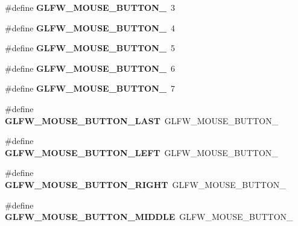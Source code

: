 \begin{DoxyCompactItemize}
\item 
\mbox{\label{group__buttons_ga53f4097bb01d5521c7d9513418c91ca9}} 
\#define {\bfseries G\+L\+F\+W\+\_\+\+M\+O\+U\+S\+E\+\_\+\+B\+U\+T\+T\+O\+N\+\_}~3
\item 
\mbox{\label{group__buttons_gaf08c4ddecb051d3d9667db1d5e417c9c}} 
\#define {\bfseries G\+L\+F\+W\+\_\+\+M\+O\+U\+S\+E\+\_\+\+B\+U\+T\+T\+O\+N\+\_}~4
\item 
\mbox{\label{group__buttons_gae8513e06aab8aa393b595f22c6d8257a}} 
\#define {\bfseries G\+L\+F\+W\+\_\+\+M\+O\+U\+S\+E\+\_\+\+B\+U\+T\+T\+O\+N\+\_}~5
\item 
\mbox{\label{group__buttons_ga8b02a1ab55dde45b3a3883d54ffd7dc7}} 
\#define {\bfseries G\+L\+F\+W\+\_\+\+M\+O\+U\+S\+E\+\_\+\+B\+U\+T\+T\+O\+N\+\_}~6
\item 
\mbox{\label{group__buttons_ga35d5c4263e0dc0d0a4731ca6c562f32c}} 
\#define {\bfseries G\+L\+F\+W\+\_\+\+M\+O\+U\+S\+E\+\_\+\+B\+U\+T\+T\+O\+N\+\_}~7
\item 
\mbox{\label{group__buttons_gab1fd86a4518a9141ec7bcde2e15a2fdf}} 
\#define {\bfseries G\+L\+F\+W\+\_\+\+M\+O\+U\+S\+E\+\_\+\+B\+U\+T\+T\+O\+N\+\_\+\+L\+A\+ST}~G\+L\+F\+W\+\_\+\+M\+O\+U\+S\+E\+\_\+\+B\+U\+T\+T\+O\+N\+\_
\item 
\mbox{\label{group__buttons_gaf37100431dcd5082d48f95ee8bc8cd56}} 
\#define {\bfseries G\+L\+F\+W\+\_\+\+M\+O\+U\+S\+E\+\_\+\+B\+U\+T\+T\+O\+N\+\_\+\+L\+E\+FT}~G\+L\+F\+W\+\_\+\+M\+O\+U\+S\+E\+\_\+\+B\+U\+T\+T\+O\+N\+\_
\item 
\mbox{\label{group__buttons_ga3e2f2cf3c4942df73cc094247d275e74}} 
\#define {\bfseries G\+L\+F\+W\+\_\+\+M\+O\+U\+S\+E\+\_\+\+B\+U\+T\+T\+O\+N\+\_\+\+R\+I\+G\+HT}~G\+L\+F\+W\+\_\+\+M\+O\+U\+S\+E\+\_\+\+B\+U\+T\+T\+O\+N\+\_
\item 
\mbox{\label{group__buttons_ga34a4d2a701434f763fd93a2ff842b95a}} 
\#define {\bfseries G\+L\+F\+W\+\_\+\+M\+O\+U\+S\+E\+\_\+\+B\+U\+T\+T\+O\+N\+\_\+\+M\+I\+D\+D\+LE}~G\+L\+F\+W\+\_\+\+M\+O\+U\+S\+E\+\_\+\+B\+U\+T\+T\+O\+N\+\_

\end{DoxyCompactItemize}
